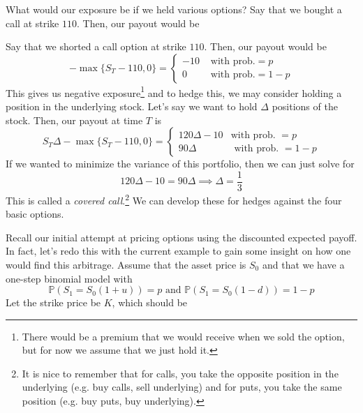 \documentclass{article}
\begin{document}
    What would our exposure be if we held various options? Say that we bought a call at strike $110$. Then, our payout would be 

    Say that we shorted a call option at strike $110$. Then, our payout would be 
    \begin{equation}
      - \max\{ S_T - 110, 0 \} = \begin{cases} 
        -10 & \text{ with prob.} = p \\ 
        0 & \text{ with prob.} = 1 - p 
      \end{cases}
    \end{equation}
    This gives us negative exposure\footnote{There would be a premium that we would receive when we sold the option, but for now we assume that we just hold it. } and to hedge this, we may consider holding a position in the underlying stock. Let's say we want to hold $\Delta$ positions of the stock. Then, our payout at time $T$ is 
    \begin{equation}
      S_T \Delta - \max\{S_T - 110, 0\} = \begin{cases} 
        120 \Delta - 10 & \text{with prob. } = p  \\ 
        90\Delta & \text{ with prob. } = 1 - p
      \end{cases} 
    \end{equation}
    If we wanted to minimize the variance of this portfolio, then we can just solve for 
    \begin{equation}
      120 \Delta - 10 = 90 \Delta \implies \Delta = \frac{1}{3} 
    \end{equation}
    This is called a \textit{covered call}.\footnote{It is nice to remember that for calls, you take the opposite position in the underlying (e.g. buy calls, sell underlying) and for puts, you take the same position (e.g. buy puts, buy underlying). } We can develop these for hedges against the four basic options. 

    Recall our initial attempt at pricing options using the discounted expected payoff. In fact, let's redo this with the current example to gain some insight on how one would find this arbitrage. Assume that the asset price is $S_0$ and that we have a one-step binomial model with 
    \begin{equation}
      \mathbb{P}(S_1 = S_0 (1 + u)) = p \text{ and } \mathbb{P}(S_1 = S_0 (1 - d)) = 1 - p
    \end{equation}
    Let the strike price be $K$, which should be  
\end{document}
